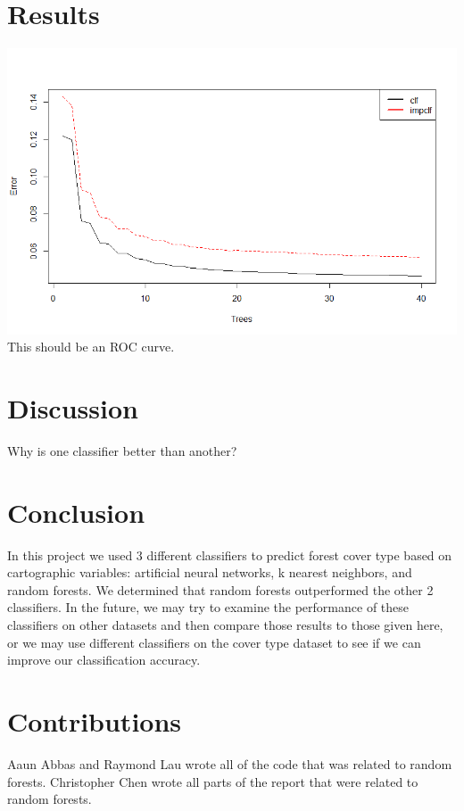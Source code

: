 \documentclass[11pt]{article}
\begin{document}
\section{Results}
\includegraphics[width=\linewidth]{images/Rplot.png}
This should be an ROC curve.

\section{Discussion}
Why is one classifier better than another?

\section{Conclusion}
In this project we used 3 different classifiers to predict forest cover type based on cartographic variables: artificial neural networks, k nearest neighbors, and random forests. We determined that random forests outperformed the other 2 classifiers. In the future, we may try to examine the performance of these classifiers on other datasets and then compare those results to those given here, or we may use different classifiers on the cover type dataset to see if we can improve our classification accuracy.

\section{Contributions}
Aaun Abbas and Raymond Lau wrote all of the code that was related to random forests. Christopher Chen wrote all parts of the report that were related to random forests.
\end{document}
